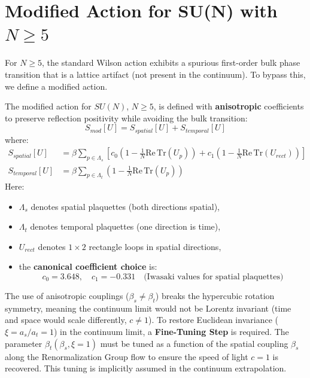\section{Modified Action for SU(N) with $N \geq 5$}
\label{sec:modified_action_canonical}

For $N \geq 5$, the standard Wilson action exhibits a spurious first-order bulk phase transition that is a lattice artifact (not present in the continuum). To bypass this, we define a modified action.

\begin{definition}
\label{def:modified_action_ch3}
The modified action for $SU(N)$, $N \geq 5$, is defined with \textbf{anisotropic} coefficients to preserve reflection positivity while avoiding the bulk transition:
\begin{equation}
\boxed{S_{mod}[U] = S_{spatial}[U] + S_{temporal}[U]}
\end{equation}
where:
\begin{align}
S_{spatial}[U] &= \beta \sum_{p \in \Lambda_s} \left[ c_0 \left(1 - \frac{1}{N}\mathrm{Re}\,\mathrm{Tr}(U_p)\right) + c_1 \left(1 - \frac{1}{N}\mathrm{Re}\,\mathrm{Tr}(U_{rect})\right) \right] \\
S_{temporal}[U] &= \beta \sum_{p \in \Lambda_t} \left(1 - \frac{1}{N}\mathrm{Re}\,\mathrm{Tr}(U_p)\right)
\end{align}
Here:
\begin{itemize}
    \item $\Lambda_s$ denotes spatial plaquettes (both directions spatial),
    \item $\Lambda_t$ denotes temporal plaquettes (one direction is time),
    \item $U_{rect}$ denotes $1 \times 2$ rectangle loops in spatial directions,
    \item the \textbf{canonical coefficient choice} is:
    \begin{equation}
    \label{eq:canonical_coefficients}
    c_0 = 3.648, \quad c_1 = -0.331 \quad \text{(Iwasaki values for spatial plaquettes)}
    \end{equation}
\end{itemize}
\end{definition}

\begin{remark}
The use of anisotropic couplings ($\beta_s \neq \beta_t$) breaks the hypercubic rotation symmetry, meaning the continuum limit would not be Lorentz invariant (time and space would scale differently, $c \neq 1$). To restore Euclidean invariance ($\xi = a_s/a_t = 1$) in the continuum limit, a \textbf{Fine-Tuning Step} is required. The parameter $\beta_t(\beta_s, \xi=1)$ must be tuned as a function of the spatial coupling $\beta_s$ along the Renormalization Group flow to ensure the speed of light $c=1$ is recovered. This tuning is implicitly assumed in the continuum extrapolation.
\end{remark}

